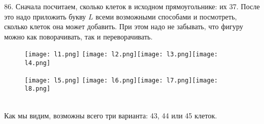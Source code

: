 86. Сначала посчитаем, сколько клеток в исходном прямоугольнике: их 37. После это надо приложить букву $L$ всеми возможными способами и посмотреть, сколько клеток она может добавить. При этом надо не забывать, что фигуру можно как поворачивать, так и переворачивать.
\begin{figure}[ht!]
\texttt{[image: l1.png]} \texttt{[image: l2.png]}\texttt{[image: l3.png]}\texttt{[image: l4.png]}\end{figure}
\begin{figure}[ht!]\texttt{[image: l5.png]} \texttt{[image: l6.png]}\texttt{[image: l7.png]}\texttt{[image: l8.png]}
\end{figure}\\
Как мы видим, возможны всего три варианта: 43, 44 или 45 клеток.
\newpage\noindent
